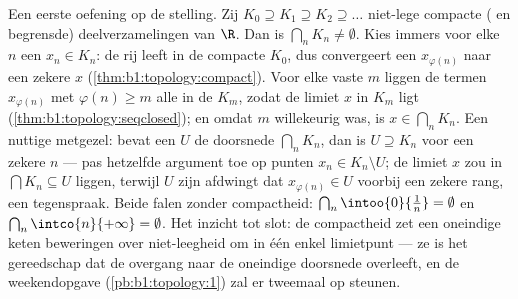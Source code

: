 \begin{example}\label{ex:b1:topology:nested}
Een eerste oefening op de stelling. Zij $K_0 \supseteq K_1 \supseteq K_2
\supseteq \dots$ niet-lege compacte ( en begrensde)
deelverzamelingen van $\R$. Dan is $\bigcap_n K_n \neq \emptyset$. Kies
immers voor elke $n$ een $x_n \in K_n$: de rij leeft in de compacte
$K_0$, dus convergeert een  $x_{\varphi(n)}$ naar een zekere $x$
(\cref{thm:b1:topology:compact}). Voor elke vaste $m$ liggen de termen
$x_{\varphi(n)}$ met $\varphi(n) \geq m$ alle in de 
$K_m$, zodat de limiet $x$ in $K_m$ ligt
(\cref{thm:b1:topology:seqclosed}); en omdat $m$ willekeurig was, is $x
\in \bigcap_n K_n$. Een nuttige metgezel: bevat een  $U$
de doorsnede $\bigcap_n K_n$, dan is $U \supseteq K_n$ voor een zekere
$n$ --- pas hetzelfde argument toe op punten $x_n \in K_n \setminus U$;
de limiet $x$ zou in $\bigcap K_n \subseteq U$ liggen, terwijl $U$ 
zijn afdwingt dat $x_{\varphi(n)} \in U$ voorbij een zekere rang, een
tegenspraak. Beide  falen zonder compactheid: $\bigcap_n
\intoo{0}{\frac 1n} = \emptyset$ en $\bigcap_n \intco{n}{+\infty} =
\emptyset$. Het inzicht tot slot: de compactheid zet een oneindige keten
beweringen over niet-leegheid om in één enkel limietpunt --- ze is het
gereedschap dat de overgang naar de oneindige doorsnede overleeft, en de
weekendopgave (\cref{pb:b1:topology:1}) zal er tweemaal op steunen.
\end{example}

